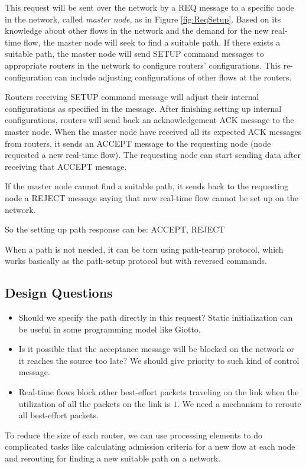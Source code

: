 \documentclass[conference, twocolumn]{IEEEtran}
\theoremstyle{definition}
\begin{document}
This request will be sent over the network by a REQ message to a specific node
in the network, called {\em master node}, as in Figure \ref{fig:ReqSetup}.
Based on its knowledge about other flows in the network and the demand for the
new real-time flow, the master node will seek to find a suitable path. If there
exists a suitable path, the master node will send SETUP command messages to
appropriate routers in the network to configure routers' configurations. This
re-configuration can include adjusting configurations of other flows at the routers.

Routers receiving SETUP command message will adjust their internal
configurations as specified in the message. After finishing setting up internal
configurations, routers will send back an acknowledgement ACK message to
the master node. When the master node have received all its expected ACK
messages from routers, it sends an ACCEPT message to the requesting node
(node requested a new real-time flow). The requesting node can start sending
data after receiving that ACCEPT message.

If the master node cannot find a suitable path, it sends back to the requesting
node a REJECT message saying that new real-time flow cannot be set up on the
network.

So the setting up path response can be: ACCEPT, REJECT

When a path is not needed, it can be torn using path-tearup protocol, which
works basically as the path-setup protocol but with reversed commands.

\subsection{Design Questions}
\begin{itemize}
\item Should we specify the path directly in this request? Static initialization 
can be useful in some programming model like Giotto.	
\item Is it possible that the acceptance message will be blocked on the network 
or it reaches the source too late? We should give priority to such kind of control
message.
\item Real-time flows block other best-effort packets traveling on the link when 
the utilization of all the packets on the link is $1$. We need a mechanism to
reroute all best-effort packets.
\end{itemize}

To reduce the size of each router, we can use processing elements to do 
complicated tasks like calculating admission criteria for a new flow at each node 
and rerouting for finding a new suitable path on a network.
\end{document}
